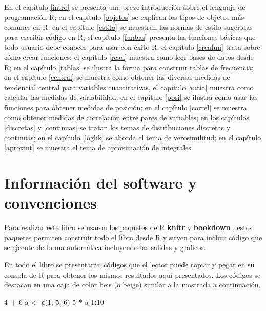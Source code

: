 \documentclass[10pt,]{krantz}
\makeatletter
\newenvironment{Shaded}{\begin{snugshade}}{\end{snugshade}}
\newcommand{\KeywordTok}[1]{\textcolor[rgb]{0.13,0.29,0.53}{\textbf{#1}}}
\newcommand{\DecValTok}[1]{\textcolor[rgb]{0.00,0.00,0.81}{#1}}
\newcommand{\StringTok}[1]{\textcolor[rgb]{0.31,0.60,0.02}{#1}}
\newcommand{\OperatorTok}[1]{\textcolor[rgb]{0.81,0.36,0.00}{\textbf{#1}}}
\newcommand{\NormalTok}[1]{#1}
\newenvironment{kframe}{%
\medskip{}
\setlength{\fboxsep}{.8em}
 \def\at@end@of@kframe{}%
 \ifinner\ifhmode%
  \def\at@end@of@kframe{\end{minipage}}%
  \begin{minipage}{\columnwidth}%
 \fi\fi%
 \def\FrameCommand##1{\hskip\@totalleftmargin \hskip-\fboxsep
 \colorbox{shadecolor}{##1}\hskip-\fboxsep
     \hskip-\linewidth \hskip-\@totalleftmargin \hskip\columnwidth}%
 \MakeFramed {\advance\hsize-\width
   \@totalleftmargin\z@ \linewidth\hsize
   \@setminipage}}%
 {\par\unskip\endMakeFramed%
 \at@end@of@kframe}
\renewenvironment{Shaded}{\begin{kframe}}{\end{kframe}}
\makeatother
\begin{document}
En el capítulo \ref{intro} se presenta una breve introducción sobre el
lenguaje de programación R; en el capítulo \ref{objetos} se explican los
tipos de objetos más comunes en R; en el capítulo \ref{estilo} se
muestran las normas de estilo sugeridas para escribir código en R; el
capítulo \ref{funbas} presenta las funciones básicas que todo usuario
debe conocer para usar con éxito R; el capítulo \ref{creafun} trata
sobre cómo crear funciones; el capítulo \ref{read} muestra como leer
bases de datos desde R; en el capítulo \ref{tablas} se ilustra la forma
para construir tablas de frecuencia; en el capítulo \ref{central} se
muestra como obtener las diversas medidas de tendencial central para
variables cuantitativas, el capítulo \ref{varia} muestra como calcular
las medidas de variabilidad, en el capítulo \ref{posi} se ilustra cómo
usar las funciones para obtener medidas de posición; en el capítulo
\ref{correl} se muestra como obtener medidas de correlación entre pares
de variables; en los capítulos \ref{discretas} y \ref{continuas} se
tratan los temas de distribuciones discretas y continuas; en el capítulo
\ref{loglik} se aborda el tema de verosimilitud; en el capítulo
\ref{aproxint} se muestra el tema de aproximación de integrales.

\section*{Información del software y
convenciones}\label{informacion-del-software-y-convenciones}


Para realizar este libro se usaron los paquetes de R
\textbf{knitr} \citep{xie2015} y
\textbf{bookdown} \citep{R-bookdown}, estos paquetes
permiten construir todo el libro desde R y sirven para incluir código
que se ejecute de forma automática incluyendo las salidas y gráficos.

En todo el libro se presentarán códigos que el lector puede copiar y
pegar en su consola de R para obtener los mismos resultados aquí
presentados. Los códigos se destacan en una caja de color beis (o beige)
similar a la mostrada a continuación.

\begin{Shaded}
\begin{Highlighting}[]
\DecValTok{4} \OperatorTok{+}\StringTok{ }\DecValTok{6}
\NormalTok{a <-}\StringTok{ }\KeywordTok{c}\NormalTok{(}\DecValTok{1}\NormalTok{, }\DecValTok{5}\NormalTok{, }\DecValTok{6}\NormalTok{)}
\DecValTok{5} \OperatorTok{*}\StringTok{ }\NormalTok{a}
\DecValTok{1}\OperatorTok{:}\DecValTok{10}
\end{Highlighting}
\end{Shaded}
\end{document}
